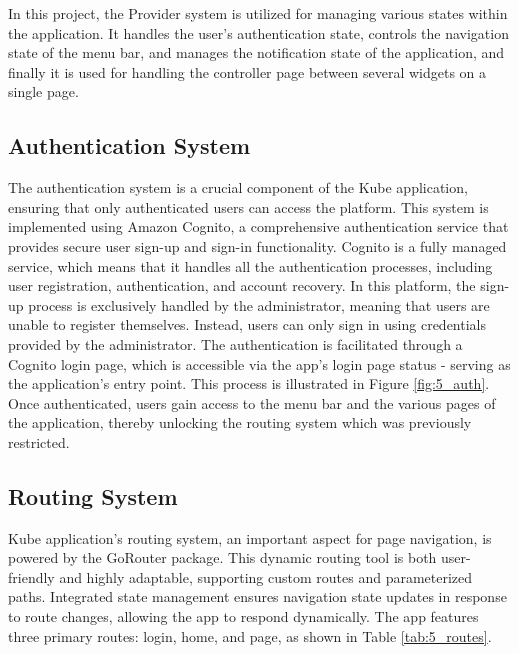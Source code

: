 In this project, the Provider system is utilized for managing various states within the application.
It handles the user's authentication state, controls the navigation state of the menu bar, and
manages the notification state of the application, and finally it is used for handling the
controller page between several widgets on a single page.

\subsection{Authentication System}
The authentication system is a crucial component of the Kube application, ensuring that only
authenticated users can access the platform. This system is implemented using Amazon Cognito, a
comprehensive authentication service that provides secure user sign-up and sign-in functionality.
Cognito is a fully managed service, which means that it handles all the authentication processes,
including user registration, authentication, and account recovery.
\newline\newline
In this platform, the sign-up process is exclusively handled by the administrator, meaning that
users are unable to register themselves. Instead, users can only sign in using credentials provided
by the administrator. The authentication is facilitated through a Cognito login page, which is
accessible via the app's login page status - serving as the application's entry point. This process
is illustrated in Figure \ref{fig:5_auth}. Once authenticated, users gain access to the menu bar and
the various pages of the application, thereby unlocking the routing system which was previously
restricted.


\subsection{Routing System}
Kube application's routing system, an important aspect for page navigation, is powered by the
GoRouter package. This dynamic routing tool is both user-friendly and highly adaptable, supporting
custom routes and parameterized paths. Integrated state management ensures navigation state updates
in response to route changes, allowing the app to respond dynamically. The app features three
primary routes: login, home, and page, as shown in Table \ref{tab:5_routes}.

